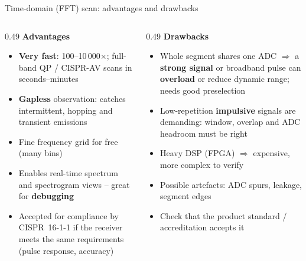 \documentclass[aspectratio=169]{beamer}
\newcommand{\plus}{\textcolor{okc}{\textbf{+}}}
\newcommand{\minus}{\textcolor{badc}{\textbf{--}}}
\begin{document}
\begin{frame}{Time-domain (FFT) scan: advantages and drawbacks}

\begin{columns}[T]
\begin{column}{0.49\textwidth}
  \textcolor{okc}{\large\textbf{Advantages}}
  \small
  \begin{itemize}
    \item[\plus] \textbf{Very fast}: 100--10\,000$\times$; full-band
                 QP / CISPR-AV scans in seconds--minutes
    \item[\plus] \textbf{Gapless} observation: catches intermittent,
                 hopping and transient emissions
    \item[\plus] Fine frequency grid for free (many bins)
    \item[\plus] Enables real-time spectrum and spectrogram views --
                 great for \textbf{debugging}
    \item[\plus] Accepted for compliance by CISPR~16-1-1 if the receiver
                 meets the same requirements (pulse response, accuracy)
  \end{itemize}
\end{column}
\begin{column}{0.49\textwidth}
  \textcolor{badc}{\large\textbf{Drawbacks}}
  \small
  \begin{itemize}
    \item[\minus] Whole segment shares one ADC $\Rightarrow$ a \textbf{strong
                  signal} or broadband pulse can \textbf{overload} or reduce
                  dynamic range; needs good preselection
    \item[\minus] Low-repetition \textbf{impulsive} signals are demanding:
                  window, overlap and ADC headroom must be right
    \item[\minus] Heavy DSP (FPGA) $\Rightarrow$ expensive, more complex to verify
    \item[\minus] Possible artefacts: ADC spurs, leakage, segment edges
    \item[\minus] Check that the product standard / accreditation accepts it
  \end{itemize}
\end{column}
\end{columns}

\end{frame}
\end{document}
